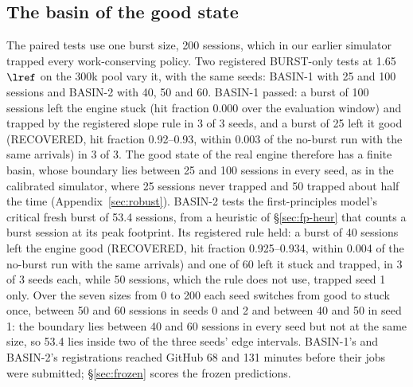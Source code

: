 \subsection{The basin of the good state}\label{sec:basin}
The paired tests use one burst size, 200 sessions, which in our earlier simulator trapped every work-conserving policy. Two registered BURST-only tests at 1.65 $\lref$ on the 300k pool vary it, with the same seeds: BASIN-1 with 25 and 100 sessions and BASIN-2 with 40, 50 and 60. BASIN-1 passed: a burst of 100 sessions left the engine stuck (hit fraction 0.000 over the evaluation window) and trapped by the registered slope rule in 3 of 3 seeds, and a burst of 25 left it good (RECOVERED, hit fraction 0.92--0.93, within 0.003 of the no-burst run with the same arrivals) in 3 of 3. The good state of the real engine therefore has a finite basin, whose boundary lies between 25 and 100 sessions in every seed, as in the calibrated simulator, where 25 sessions never trapped and 50 trapped about half the time (Appendix~\ref{sec:robust}). BASIN-2 tests the first-principles model's critical fresh burst of 53.4 sessions, from a heuristic of \S\ref{sec:fp-heur} that counts a burst session at its peak footprint. Its registered rule held: a burst of 40 sessions left the engine good (RECOVERED, hit fraction 0.925--0.934, within 0.004 of the no-burst run with the same arrivals) and one of 60 left it stuck and trapped, in 3 of 3 seeds each, while 50 sessions, which the rule does not use, trapped seed 1 only. Over the seven sizes from 0 to 200 each seed switches from good to stuck once, between 50 and 60 sessions in seeds 0 and 2 and between 40 and 50 in seed 1: the boundary lies between 40 and 60 sessions in every seed but not at the same size, so 53.4 lies inside two of the three seeds' edge intervals. BASIN-1's and BASIN-2's registrations reached GitHub 68 and 131 minutes before their jobs were submitted; \S\ref{sec:frozen} scores the frozen predictions.

